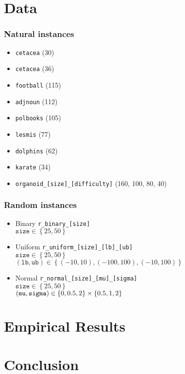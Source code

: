 \documentclass{beamer}
\begin{document}
\section{Data}
\begin{frame}
	\frametitle{Natural instances}	
	\begin{itemize}
		\item<1-> \texttt{cetacea} (30)
		\item<1-> \texttt{cetacea} (36)
		\item<2-> \texttt{football} (115)
		\item<2-> \texttt{adjnoun} (112)
		\item<2-> \texttt{polbooks} (105)
		\item<2-> \texttt{lesmis} (77)
		\item<2-> \texttt{dolphins} (62)
		\item<2-> \texttt{karate} (34)
		\item<3-> \texttt{organoid\_[size]\_[difficulty]} (160, 100, 80, 40)
	\end{itemize}
\end{frame}

\begin{frame}
	\frametitle{Random instances}	
	\begin{itemize}
		\item<1-> Binary \texttt{r\_binary\_[size]} \\
			$\texttt{size} \in \left\{ 25, 50 \right\}$
		\item<2-> Uniform \texttt{r\_uniform\_[size]\_[lb]\_[ub]} \\
			$\texttt{size} \in \left\{ 25, 50 \right\}$ \\
			$(\texttt{lb}, \texttt{ub}) \in \left\{ (-10, 10), (-100, 100), (-10, 100) \right\}$
		\item<3-> Normal \texttt{r\_normal\_[size]\_[mu]\_[sigma]} \\
			$\texttt{size} \in \left\{ 25, 50 \right\}$ \\
			$(\text{\texttt{mu}}, \text{\texttt{sigma}}) \in \left\{ 0, 0.5, 2 \right\} \times \left\{ 0.5, 1, 2 \right\}$

	\end{itemize}
	\end{frame}

\section{Empirical Results}

\section{Conclusion}
\end{document}
